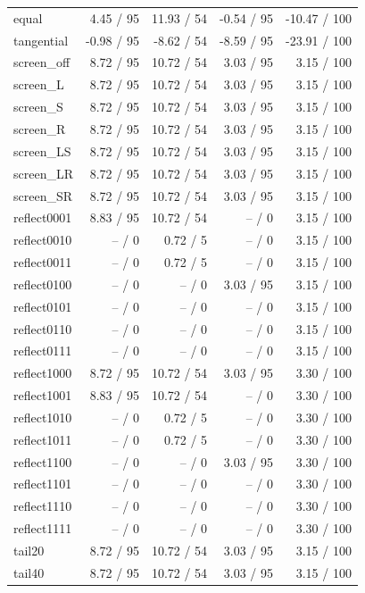 \documentclass[11pt]{article}
\begin{document}
\begin{longtable}{@{}lrrrr@{}}
equal & 4.45 / 95 & 11.93 / 54 & -0.54 / 95 & -10.47 / 100\\
tangential & -0.98 / 95 & -8.62 / 54 & -8.59 / 95 & -23.91 / 100\\
screen\_\allowbreak off & 8.72 / 95 & 10.72 / 54 & 3.03 / 95 & 3.15 / 100\\
screen\_\allowbreak L & 8.72 / 95 & 10.72 / 54 & 3.03 / 95 & 3.15 / 100\\
screen\_\allowbreak S & 8.72 / 95 & 10.72 / 54 & 3.03 / 95 & 3.15 / 100\\
screen\_\allowbreak R & 8.72 / 95 & 10.72 / 54 & 3.03 / 95 & 3.15 / 100\\
screen\_\allowbreak LS & 8.72 / 95 & 10.72 / 54 & 3.03 / 95 & 3.15 / 100\\
screen\_\allowbreak LR & 8.72 / 95 & 10.72 / 54 & 3.03 / 95 & 3.15 / 100\\
screen\_\allowbreak SR & 8.72 / 95 & 10.72 / 54 & 3.03 / 95 & 3.15 / 100\\
reflect0001 & 8.83 / 95 & 10.72 / 54 & -- / 0 & 3.15 / 100\\
reflect0010 & -- / 0 & 0.72 / 5 & -- / 0 & 3.15 / 100\\
reflect0011 & -- / 0 & 0.72 / 5 & -- / 0 & 3.15 / 100\\
reflect0100 & -- / 0 & -- / 0 & 3.03 / 95 & 3.15 / 100\\
reflect0101 & -- / 0 & -- / 0 & -- / 0 & 3.15 / 100\\
reflect0110 & -- / 0 & -- / 0 & -- / 0 & 3.15 / 100\\
reflect0111 & -- / 0 & -- / 0 & -- / 0 & 3.15 / 100\\
reflect1000 & 8.72 / 95 & 10.72 / 54 & 3.03 / 95 & 3.30 / 100\\
reflect1001 & 8.83 / 95 & 10.72 / 54 & -- / 0 & 3.30 / 100\\
reflect1010 & -- / 0 & 0.72 / 5 & -- / 0 & 3.30 / 100\\
reflect1011 & -- / 0 & 0.72 / 5 & -- / 0 & 3.30 / 100\\
reflect1100 & -- / 0 & -- / 0 & 3.03 / 95 & 3.30 / 100\\
reflect1101 & -- / 0 & -- / 0 & -- / 0 & 3.30 / 100\\
reflect1110 & -- / 0 & -- / 0 & -- / 0 & 3.30 / 100\\
reflect1111 & -- / 0 & -- / 0 & -- / 0 & 3.30 / 100\\
tail20 & 8.72 / 95 & 10.72 / 54 & 3.03 / 95 & 3.15 / 100\\
tail40 & 8.72 / 95 & 10.72 / 54 & 3.03 / 95 & 3.15 / 100\\

\end{longtable}
\end{document}
